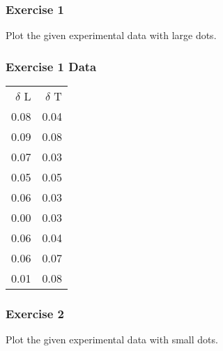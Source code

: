 \documentclass[17pt,compress]{beamer}
\begin{document}
\begin{frame}
\frametitle{Exercise 1}
\label{sec-4}

  Plot the given experimental data with large dots.
\end{frame}
\begin{frame}
\frametitle{Exercise 1 Data}
\label{sec-5}

\begin{center}
\begin{small}
\begin{tabular}{rr}
 $\delta$ L  &  $\delta$ T  \\
       0.08  &        0.04  \\
       0.09  &        0.08  \\
       0.07  &        0.03  \\
       0.05  &        0.05  \\
       0.06  &        0.03  \\
       0.00  &        0.03  \\
       0.06  &        0.04  \\
       0.06  &        0.07  \\
       0.01  &        0.08  \\
\end{tabular}
\end{small}
\end{center}   
\end{frame}
\begin{frame}
\frametitle{Exercise 2}
\label{sec-6}

  Plot the given experimental data with small dots.     
\end{frame}
\end{document}
